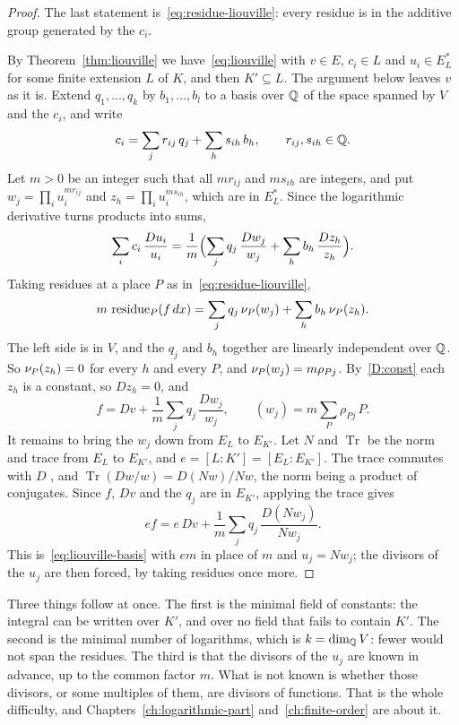 \begin{proof}
The last statement is~\eqref{eq:residue-liouville}: every residue is in the
additive group generated by the $c_i$.

By Theorem~\ref{thm:liouville} we have~\eqref{eq:liouville} with $v \in E$,
$c_i \in L$ and $u_i \in E_L^*$ for some finite extension $L$ of $K$, and
then $K' \subseteq L$. The argument below leaves $v$ as it is. Extend $q_1, \dots, q_k$ by $b_1, \dots,
b_l$ to a basis over $\mathbb{Q}$ of the space spanned by $V$ and the $c_i$, and write
\[
  c_i = \sum_j r_{ij}\, q_j + \sum_h s_{ih}\, b_h, \qquad r_{ij}, s_{ih} \in \mathbb{Q} .
\]
Let $m > 0$ be an integer such that all $m r_{ij}$ and $m s_{ih}$ are
integers, and put $w_j = \prod_i u_i^{m r_{ij}}$ and $z_h = \prod_i u_i^{m
s_{ih}}$, which are in $E_L^*$. Since the logarithmic derivative turns
products into sums,
\[
  \sum_i c_i\, \frac{Du_i}{u_i}
  = \frac{1}{m} \Bigl( \sum_j q_j\, \frac{Dw_j}{w_j}
                     + \sum_h b_h\, \frac{Dz_h}{z_h} \Bigr) .
\]
Taking residues at a place $P$ as in~\eqref{eq:residue-liouville},
\[
  m\, \operatorname{residue}_P(f\,dx) = \sum_j q_j\, \nu_{P}(w_j) + \sum_h b_h\, \nu_{P}(z_h) .
\]
The left side is in $V$, and the $q_j$ and $b_h$ together are linearly
independent over $\mathbb{Q}$. So $\nu_{P}(z_h) = 0$ for every $h$ and every $P$, and
$\nu_{P}(w_j) = m \rho_{Pj}$. By~\ref{D:const} each $z_h$ is a constant, so
$Dz_h = 0$, and
\[
  f = Dv + \frac{1}{m} \sum_j q_j\, \frac{Dw_j}{w_j},
  \qquad (w_j) = m \sum_P \rho_{Pj}\, P .
\]
It remains to bring the $w_j$ down from $E_L$ to $E_{K'}$. Let $N$ and
$\operatorname{Tr}$ be the norm and trace from $E_L$ to $E_{K'}$, and $e = [L
: K'] = [E_L : E_{K'}]$. The trace commutes with $D$ ,
and $\operatorname{Tr}(Dw/w) = D(Nw)/Nw$, the norm being a product of
conjugates. Since $f$, $Dv$ and the $q_j$ are in $E_{K'}$, applying the trace
gives
\[
  e f = e\, Dv + \frac{1}{m} \sum_j q_j\, \frac{D(N w_j)}{N w_j} .
\]
This is~\eqref{eq:liouville-basis} with $em$ in place of $m$ and $u_j = N
w_j$; the divisors of the $u_j$ are then forced, by taking residues once
more.
\end{proof}

Three things follow at once. The first is the minimal field of constants:
the integral can be written over $K'$, and over no field that fails to
contain $K'$. The second is the minimal number of logarithms, which is $k =
\dim_{\mathbb{Q}} V$: fewer would not span the residues. The third is that the divisors
of the $u_j$ are known in advance, up to the common factor $m$. What is not
known is whether those divisors, or some multiples of them, are divisors of
functions. That is the whole difficulty, and Chapters~\ref{ch:logarithmic-part}
and~\ref{ch:finite-order} are about it.

